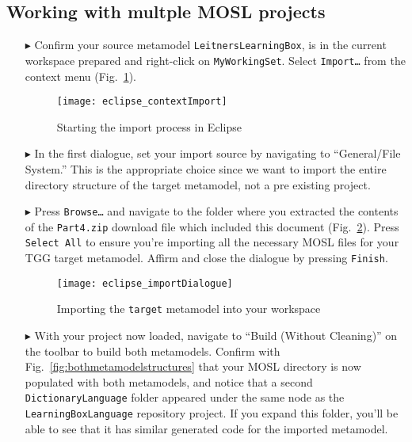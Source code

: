 \newpage
\hypertarget{multiMOSL}{}
\subsection{Working with multple MOSL projects}
\texHeader

\begin{itemize}

\item[$\blacktriangleright$] Confirm your source metamodel \texttt{LeitnersLearningBox}, is in the current workspace prepared and right-click on
\texttt{MyWorkingSet}. Select \texttt{Import\ldots} from the context menu (Fig.~\ref{fig:eclipseContextImport}).

\vspace{0.25cm}

\begin{figure}[htbp]
\begin{center}
  \texttt{[image: eclipse\_contextImport]}
  \caption{Starting the import process in Eclipse}
  \label{fig:eclipseContextImport}
\end{center}
\end{figure}

\item[$\blacktriangleright$] In the first dialogue, set your import source by navigating to ``General/File System.'' This is the appropriate choice since
we want to import the entire directory structure of the target metamodel, not a pre existing project.

\item[$\blacktriangleright$] Press \texttt{Browse\ldots} and navigate to the folder where you extracted the contents of the \texttt{Part4.zip} download file
which included this document (Fig.~\ref{fig:importFileSys}). Press \texttt{Select All} to ensure you're importing all the necessary MOSL files for your TGG
target metamodel. Affirm and close the dialogue by pressing \texttt{Finish}.

\newpage

\begin{figure}[htbp]
\begin{center}
  \texttt{[image: eclipse\_importDialogue]}
  \caption{Importing the \texttt{target} metamodel into your workspace}
  \label{fig:importFileSys}
\end{center}
\end{figure}

\item[$\blacktriangleright$] With your project now loaded, navigate to ``Build (Without Cleaning)'' on the toolbar to build both metamodels. Confirm with
Fig.~\ref{fig:bothmetamodelstructures} that your MOSL directory is now populated with both metamodels, and notice that a second \texttt{Dictionary\-Language}
folder appeared under the same node as the \texttt{LearningBoxLanguage} repository project. If you expand this folder, you'll be able to see that it has
similar generated code for the imported metamodel.


\end{itemize}
